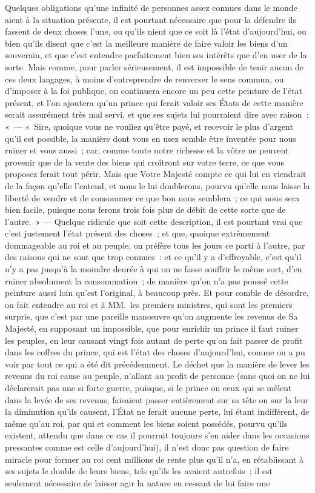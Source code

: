 \documentclass[french,twoside]{book} %
\begin{document}
Quelques obligations qu’une infinité de personnes assez connues dans le monde aient à la situation présente, il est pourtant nécessaire que pour la défendre ils fassent de deux choses l’une, ou qu’ils nient que ce soit là l’état d’aujourd’hui, ou bien qu’ils disent que c’est la meilleure manière de faire valoir les biens d’un souverain, et que c’est entendre parfaitement bien ses intérêts que d’en user de la sorte. Mais comme, pour parler sérieusement, il est impossible de tenir aucun de ces deux langages, à moins d’entreprendre de renverser le sens commun, ou d’imposer à la foi publique, on continuera encore un peu cette peinture de l’état présent, et l’on ajoutera qu’un prince qui ferait valoir ses États de cette manière serait assurément très mal servi, et que ses sujets lui pourraient dire avec raison : « — « Sire, quoique vous ne vouliez qu’être payé, et recevoir le plus d’argent qu’il est possible, la manière dont vous en usez semble être inventée pour nous ruiner et vous aussi ; car, comme toute notre richesse et la vôtre ne peuvent provenir que de la vente des biens qui croîtront sur votre terre, ce que vous proposez ferait tout périr. Mais que Votre Majesté compte ce qui lui en viendrait de la façon qu’elle l’entend, et nous le lui doublerons, pourvu qu’elle nous laisse la liberté de vendre et de consommer ce que bon nous semblera ; ce qui nous sera bien facile, puisque nous ferons trois fois plus de débit de cette sorte que de l’autre. » — Quelque ridicule que soit cette description, il est pourtant vrai que c’est justement l’état présent des choses ; et que, quoique extrêmement dommageable au roi et au peuple, on préfère tous les jours ce parti à l’autre, par des raisons qui ne sont que trop connues : et ce qu’il y a d’effroyable, c’est qu’il n’y a pas jusqu’à la moindre denrée à qui on ne fasse souffrir le même sort, d’en ruiner absolument la consommation ; de manière qu’on n’a pas poussé cette peinture aussi loin qu’est l’original, à beaucoup près. Et pour comble de désordre, on fait entendre au roi et à MM. les premiers ministres, qui sont les premiers surpris, que c’est par une pareille manœuvre qu’on augmente les revenus de Sa Majesté, en supposant un impossible, que pour enrichir un prince il faut ruiner les peuples, en leur causant vingt fois autant de perte qu’on fait passer de profit dans les coffres du prince, qui est l’état des choses d’aujourd’hui, comme on a pu voir par tout ce qui a été dit précédemment. Le déchet que la manière de lever les revenus du roi cause au peuple, n’allant au profit de personne (sans quoi on ne lui déclarerait pas une si forte guerre, puisque, si le prince ou ceux qui se mêlent dans la levée de ses revenus, faisaient passer entièrement sur sa tête ou sur la leur la diminution qu’ils causent, l’État ne ferait aucune perte, lui étant indifférent, de même qu’au roi, par qui et comment les biens soient possédés, pourvu qu’ils existent, attendu que dans ce cas il pourrait toujours s’en aider dans les occasions pressantes comme est celle d’aujourd’hui), il n’est donc pas question de faire miracle pour former au roi cent millions de rente plus qu’il n’a, en rétablissant à ses sujets le double de leurs biens, tels qu’ils les avaient autrefois ; il est seulement nécessaire de laisser agir la nature en cessant de lui faire une 
\end{document}
